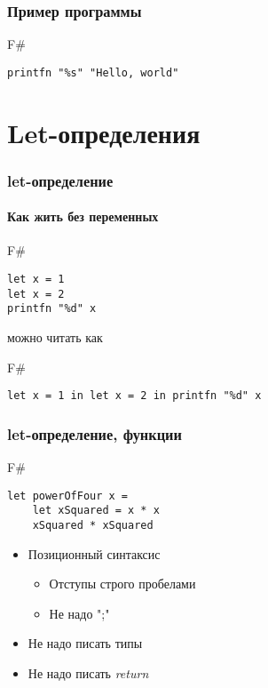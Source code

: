 \documentclass[xetex,mathserif,serif]{beamer}
\begin{document}
	\begin{frame}[fragile]
		\frametitle{Пример программы}
		\begin{exampleblock}{F\#}
			\begin{lstlisting}[showstringspaces=false]
printfn "%s" "Hello, world"
            \end{lstlisting}
		\end{exampleblock}
\end{frame}
		
	\section{Let-определения}

	\begin{frame}[fragile]
		\frametitle{let-определение}
		\framesubtitle{Как жить без переменных}
		\begin{exampleblock}{F\#}
			\begin{lstlisting}
let x = 1
let x = 2
printfn "%d" x
           \end{lstlisting}
		\end{exampleblock}
		можно читать как
		\begin{exampleblock}{F\#}
			\begin{lstlisting}
let x = 1 in let x = 2 in printfn "%d" x
            \end{lstlisting}
		\end{exampleblock}
\end{frame}
		
	\begin{frame}[fragile]
		\frametitle{let-определение, функции}
		\begin{exampleblock}{F\#}
			\begin{lstlisting}
let powerOfFour x = 
    let xSquared = x * x
    xSquared * xSquared
            \end{lstlisting}
		\end{exampleblock}
		\begin{itemize}
			\item Позиционный синтаксис
			\begin{itemize}
				\item Отступы строго пробелами
				\item Не надо ";"
			\end{itemize}
			\item Не надо писать типы
			\item Не надо писать \textit{return}
		\end{itemize}
\end{frame}
\end{document}
